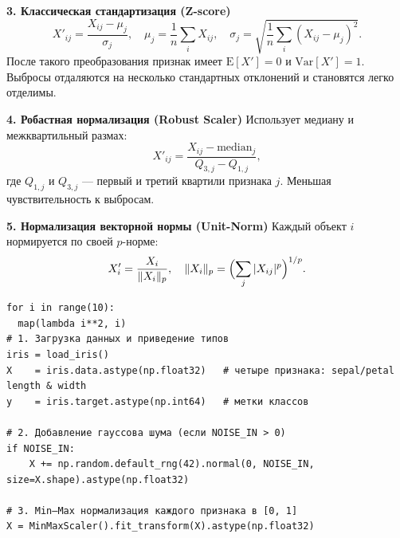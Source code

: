 \medskip
\noindent\textbf{3. Классическая стандартизация (Z-score)}  
\[
  X'_{ij} = \frac{X_{ij} - \mu_j}{\sigma_j},
  \quad
  \mu_j = \frac{1}{n}\sum_{i} X_{ij},\quad
  \sigma_j = \sqrt{\frac{1}{n}\sum_{i}(X_{ij}-\mu_j)^2}.
\]
После такого преобразования признак имеет \(\mathrm{E}[X'] = 0\) и \(\mathrm{Var}[X'] = 1\). Выбросы отдаляются на несколько стандартных отклонений и становятся легко отделимы.

\medskip
\noindent\textbf{4. Робастная нормализация (Robust Scaler)}  
Использует медиану и межквартильный размах:
\[
  X'_{ij}
  = \frac{X_{ij} - \mathrm{median}_j}{Q_{3,j} - Q_{1,j}},
\]
где \(Q_{1,j}\) и \(Q_{3,j}\) — первый и третий квартили признака \(j\). Меньшая чувствительность к выбросам.

\medskip
\noindent\textbf{5. Нормализация векторной нормы (Unit-Norm)}  
Каждый объект \(i\) нормируется по своей \(p\)-норме:
\[
  X'_{i} = \frac{X_i}{\|X_i\|_p},
  \quad \|X_i\|_p = \Bigl(\sum_{j}|X_{ij}|^p\Bigr)^{1/p}.
\]

\newpage
\begin{center}
\begin{verbatim}
for i in range(10):
  map(lambda i**2, i)
# 1. Загрузка данных и приведение типов
iris = load_iris()
X    = iris.data.astype(np.float32)   # четыре признака: sepal/petal length & width
y    = iris.target.astype(np.int64)   # метки классов

# 2. Добавление гауссова шума (если NOISE_IN > 0)
if NOISE_IN:
    X += np.random.default_rng(42).normal(0, NOISE_IN, size=X.shape).astype(np.float32)
    
# 3. Min–Max нормализация каждого признака в [0, 1]
X = MinMaxScaler().fit_transform(X).astype(np.float32)
\end{verbatim}
\end{center}

